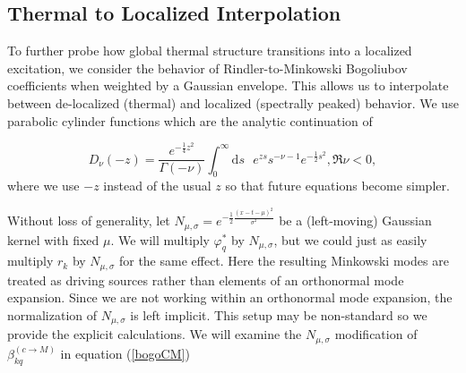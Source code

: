 \documentclass[12pt,a4paper]{article}
\newcommand{\dv}[1]{\mathrm{d} #1 \text{ }}
\begin{document}
{\subsection{Thermal to Localized Interpolation}
To further probe how global thermal structure transitions into a localized excitation, we consider the behavior of Rindler-to-Minkowski Bogoliubov coefficients when weighted by a Gaussian envelope. This allows us to interpolate between de-localized (thermal) and localized (spectrally peaked) behavior. We use parabolic cylinder functions \cite{AbramowitzStegun1964,Olver1959UniformAE} which are the analytic continuation of 

\begin{equation}
D_\nu(-z) = \frac{e^{-\frac{1}{4}z^2}}{\Gamma\left(-\nu\right)} \int_0^\infty  \dv{s} e^{zs} s^{-\nu - 1} e^{-\frac{1}{2} s^2}, \mathfrak{R}\nu < 0,
\end{equation}
where we use $-z$ instead of the usual $z$ so that future equations become simpler.


Without loss of generality, let $N_{\mu, \sigma} = e^{-\frac{1}{2} \frac{(x-t-\mu)^2}{\sigma^2}}$ be a (left-moving) Gaussian kernel with fixed $\mu$. We will multiply $\varphi_q^*$ by $N_{\mu, \sigma}$, but we could just as easily multiply $r_k$ by $N_{\mu, \sigma}$ for the same effect. Here the resulting Minkowski modes are treated as driving sources rather than elements of an orthonormal mode expansion. Since we are not working within an orthonormal mode expansion, the normalization of $N_{\mu, \sigma}$ is left implicit. This setup may be non-standard so we provide the explicit calculations.  We will examine the $N_{\mu,\sigma}$ modification of $\beta^{(c \rightarrow M)}_{kq}$ in  equation (\ref{bogoCM})

}
\end{document}
